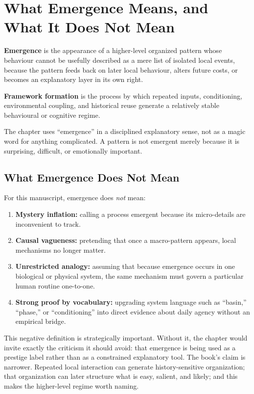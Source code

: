 \section{What Emergence Means, and What It Does Not Mean}

\begin{definition}[Emergence]
\textbf{Emergence} is the appearance of a higher-level organized pattern whose
behaviour cannot be usefully described as a mere list of isolated local events,
because the pattern feeds back on later local behaviour, alters future costs,
or becomes an explanatory layer in its own right.
\end{definition}

\begin{definition}
\textbf{Framework formation} is the process by which repeated inputs,
conditioning, environmental coupling, and historical reuse generate a
relatively stable behavioural or cognitive regime.
\end{definition}

\begin{remark}
The chapter uses ``emergence'' in a disciplined explanatory sense, not as a
magic word for anything complicated. A pattern is not emergent merely because
it is surprising, difficult, or emotionally important.
\end{remark}

\subsection{What Emergence Does Not Mean}

For this manuscript, emergence does \emph{not} mean:
\begin{enumerate}[nosep]
  \item \textbf{Mystery inflation:} calling a process emergent because its
        micro-details are inconvenient to track.
  \item \textbf{Causal vagueness:} pretending that once a macro-pattern
        appears, local mechanisms no longer matter.
  \item \textbf{Unrestricted analogy:} assuming that because emergence occurs
        in one biological or physical system, the same mechanism must govern a
        particular human routine one-to-one.
  \item \textbf{Strong proof by vocabulary:} upgrading system language such as
        ``basin,'' ``phase,'' or ``conditioning'' into direct evidence about
        daily agency without an empirical bridge.
\end{enumerate}

\begin{discussion}
This negative definition is strategically important. Without it, the chapter
would invite exactly the criticism it should avoid: that emergence is being
used as a prestige label rather than as a constrained explanatory tool. The
book's claim is narrower. Repeated local interaction can generate
history-sensitive organization; that organization can later structure what is
easy, salient, and likely; and this makes the higher-level regime worth naming.
\end{discussion}
